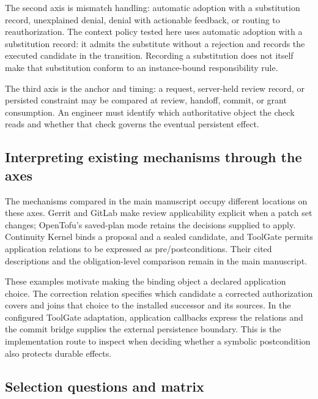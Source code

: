 The second axis is mismatch handling: automatic adoption with a substitution record, unexplained denial, denial with actionable feedback, or routing to reauthorization. The context policy tested here uses automatic adoption with a substitution record: it admits the substitute without a rejection and records the executed candidate in the transition. Recording a substitution does not itself make that substitution conform to an instance-bound responsibility rule.

The third axis is the anchor and timing: a request, server-held review record, or persisted constraint may be compared at review, handoff, commit, or grant consumption. An engineer must identify which authoritative object the check reads and whether that check governs the eventual persistent effect.

\subsection{Interpreting existing mechanisms through the axes}
The mechanisms compared in the main manuscript occupy different locations on these axes. Gerrit and GitLab make review applicability explicit when a patch set changes; OpenTofu's saved-plan mode retains the decisions supplied to apply. Continuity Kernel binds a proposal and a sealed candidate, and ToolGate permits application relations to be expressed as pre/postconditions. Their cited descriptions and the obligation-level comparison remain in the main manuscript.

These examples motivate making the binding object a declared application choice. The correction relation specifies which candidate a corrected authorization covers and joins that choice to the installed successor and its sources. In the configured ToolGate adaptation, application callbacks express the relations and the commit bridge supplies the external persistence boundary. This is the implementation route to inspect when deciding whether a symbolic postcondition also protects durable effects.

\subsection{Selection questions and matrix}
